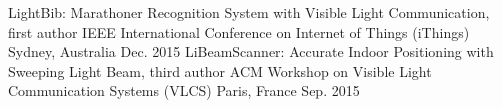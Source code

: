 \documentclass[13pt, a4paper]{awesome-cv}
\begin{document}
\begin{cvskills}
\end{cvskills}

\begin{cventries}
    \cventry
        {LightBib: Marathoner Recognition System with Visible Light Communication, first author}
        {IEEE International Conference on Internet of Things (iThings)}
        {Sydney, Australia}
        {Dec. 2015}
        {}
    \cventry
        {LiBeamScanner: Accurate Indoor Positioning with Sweeping Light Beam, third author}
        {ACM Workshop on Visible Light Communication Systems (VLCS)}
        {Paris, France}
        {Sep. 2015}
        {}
\end{cventries}
\end{document}

